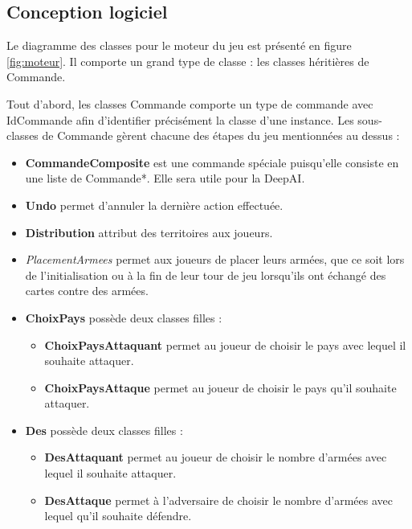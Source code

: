 \newpage
\subsection{Conception logiciel}
Le diagramme des classes pour le moteur du jeu est présenté en figure \ref{fig:moteur}. Il comporte un grand type de classe : les classes héritières de Commande.

Tout d'abord, les classes Commande comporte un type de commande avec IdCommande afin d'identifier précisément la classe d’une instance. Les sous-classes de Commande gèrent chacune des étapes du jeu mentionnées au dessus :
\begin{itemize}
    \item \textbf{CommandeComposite} est une commande spéciale puisqu'elle consiste en une liste de Commande*. Elle sera utile pour la DeepAI.
    
    \item \textbf{Undo} permet d'annuler la dernière action effectuée.

    \item \textbf{Distribution} attribut des territoires aux joueurs.
    
    \item \textit{PlacementArmees} permet aux joueurs de placer leurs armées, que ce soit lors de l'initialisation ou à la fin de leur tour de jeu lorsqu'ils ont échangé des cartes contre des armées.
    
    \item \textbf{ChoixPays} possède deux classes filles :
    \begin{itemize}
        \item \textbf{ChoixPaysAttaquant} permet au joueur de choisir le pays avec lequel il souhaite attaquer.
        \item \textbf{ChoixPaysAttaque} permet au joueur de choisir le pays qu'il souhaite attaquer.
    \end{itemize}
    
    \item \textbf{Des} possède deux classes filles :
    \begin{itemize}
        \item \textbf{DesAttaquant} permet au joueur de choisir le nombre d'armées avec lequel il souhaite attaquer.
        \item \textbf{DesAttaque} permet à l'adversaire de choisir le nombre d'armées avec lequel qu'il souhaite défendre.
    \end{itemize}
    

\end{itemize}
